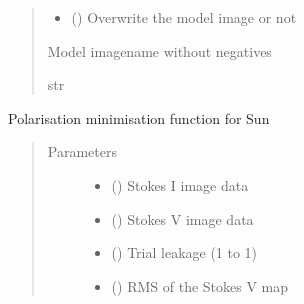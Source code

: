 \documentclass[letterpaper,10pt,english]{sphinxmanual}
\begin{document}
\begin{fulllineitems}
\begin{fulllineitems}
\begin{quote}
\begin{description}
\begin{itemize}
\item {} 
\sphinxAtStartPar
{} () \textendash{} Overwrite the model image or not

\end{itemize}

\item[{Returns}] \leavevmode
\sphinxAtStartPar
Model imagename without negatives

\item[{Return type}] \leavevmode
\sphinxAtStartPar
str

\end{description}\end{quote}

\end{fulllineitems}


\begin{fulllineitems}
\label{\detokenize{paircars:paircars.fullpol_selfcal_LTS.PolSelfcal.solarcir_pol_minimise}}
\sphinxAtStartPar
Polarisation minimisation function for Sun
\begin{quote}\begin{description}
\item[{Parameters}] \leavevmode\begin{itemize}
\item {} 
\sphinxAtStartPar
{} () \textendash{} Stokes I image data

\item {} 
\sphinxAtStartPar
{} () \textendash{} Stokes V image data

\item {} 
\sphinxAtStartPar
{} () \textendash{} Trial leakage (\sphinxhyphen{}1 to 1)

\item {} 
\sphinxAtStartPar
{} () \textendash{} RMS of the Stokes V map


\end{itemize}
\end{description}
\end{quote}
\end{fulllineitems}
\end{fulllineitems}
\end{document}
